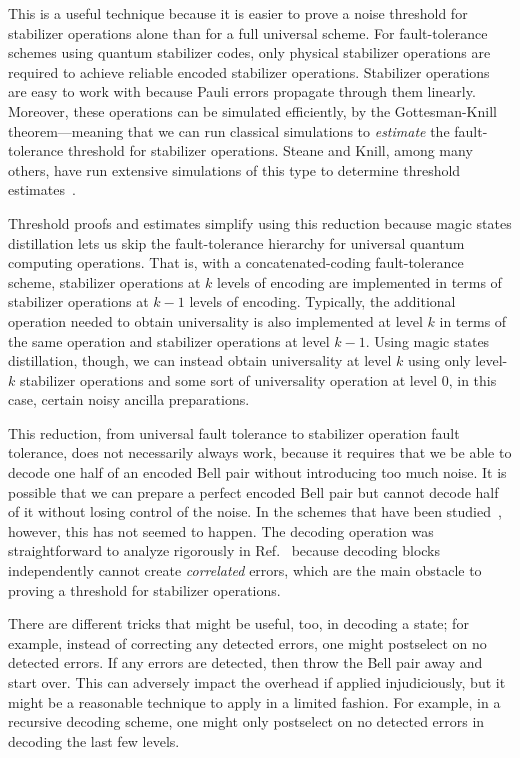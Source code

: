 \documentclass[11pt]{article}
\theoremstyle{note}
\begin{document}
This is a useful technique because it is easier to prove a noise threshold for stabilizer operations alone than for a full universal scheme.  For fault-tolerance schemes using quantum stabilizer codes, only physical stabilizer operations are required to achieve reliable encoded stabilizer operations.  Stabilizer operations are easy to work with because Pauli errors propagate through them linearly.  Moreover, these operations can be simulated efficiently, by the Gottesman-Knill theorem---meaning that we can run classical simulations to \emph{estimate} the fault-tolerance threshold for stabilizer operations.  Steane and Knill, among many others, have run extensive simulations of this type to determine threshold estimates~\cite{Steane03, Knill05}.  

Threshold proofs and estimates simplify using this reduction because magic states distillation lets us skip the fault-tolerance hierarchy for universal quantum computing operations.  That is, with a concatenated-coding fault-tolerance scheme, stabilizer operations at $k$ levels of encoding are implemented in terms of stabilizer operations at $k-1$ levels of encoding.  Typically, the additional operation needed to obtain universality is also implemented at level $k$ in terms of the same operation and stabilizer operations at level $k-1$.  Using magic states distillation, though, we can instead obtain universality at level $k$ using only level-$k$ stabilizer operations and some sort of universality operation at level $0$, in this case, certain noisy ancilla preparations.  

This reduction, from universal fault tolerance to stabilizer operation fault tolerance, does not necessarily always work, because it requires that we be able to decode one half of an encoded Bell pair without introducing too much noise.  It is possible that we can prepare a perfect encoded Bell pair but cannot decode half of it without losing control of the noise.  In the schemes that have been studied~\cite{Knill05,Reichardt05distancethree}, however, this has not seemed to happen.  The decoding operation was straightforward to analyze rigorously in Ref.~\cite{Reichardt05distancethree} because decoding blocks independently cannot create \emph{correlated} errors, which are the main obstacle to proving a threshold for stabilizer operations.  

There are different tricks that might be useful, too, in decoding a state; for example, instead of correcting any detected errors, one might postselect on no detected errors.  If any errors are detected, then throw the Bell pair away and start over.  This can adversely impact the overhead if applied injudiciously, but it might be a reasonable technique to apply in a limited fashion.  For example, in a recursive decoding scheme, one might only postselect on no detected errors in decoding the last few levels.
\end{document}
